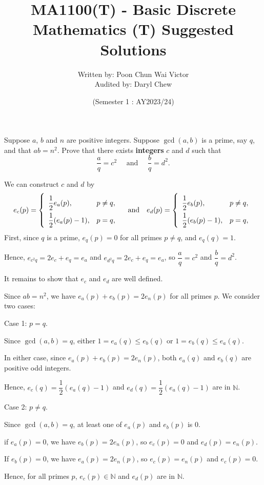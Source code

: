 \documentclass[a4paper, 11pt]{exam}
\title{\vspace{-0.5cm}MA1100(T) - Basic Discrete Mathematics (T) Suggested Solutions}
\author{Written by: Poon Chun Wai Victor\\Audited by: Daryl Chew}
\date{(Semester 1 : AY2023/24)}
\newcommand{\solbox}[1]{\begin{EnvFullwidth}\begin{solution}#1\end{solution}\end{EnvFullwidth}}
\begin{document}
\maketitle
\thispagestyle{headandfoot}
\begin{questions}
\question[4] Suppose \(a\), \(b\) and \(n\) are positive integers. Suppose \(\gcd(a,b)\) is a prime, say \(q\), and that \(ab=n^2\). Prove that there exists \textbf{integers} \(c\) and \(d\) such that
\[\frac{a}{q}=c^2\quad\text{ and }\quad\frac{b}{q}=d^2.\]

\solbox{
We can construct \(c\) and \(d\) by
\[e_c(p)=\left\{\renewcommand{\arraystretch}{2}\begin{array}{ll}
    \dfrac{1}{2}e_a(p),&p\neq q,\\
    \dfrac{1}{2}(e_a(p)-1),&p=q,
\end{array}\right.
\quad\text{and}\quad
e_d(p)=\left\{\renewcommand{\arraystretch}{2}\begin{array}{ll}
    \dfrac{1}{2}e_b(p),&p\neq q,\\
    \dfrac{1}{2}(e_b(p)-1),&p=q,
\end{array}\right.
\]
First, since \(q\) is a prime, \(e_q(p)=0\) for all primes \(p\neq q\), and \(e_q(q)=1\).

Hence, \(e_{c^2q}=2e_c+e_q=e_a\) and \(e_{d^2q}=2e_c+e_q=e_a\), so \(\dfrac{a}{q}=c^2\) and \(\dfrac{b}{q}=d^2\).

It remains to show that \(e_c\) and \(e_d\) are well defined.

Since \(ab=n^2\), we have \(e_a(p)+e_b(p)=2e_n(p)\) for all primes \(p\). We consider two cases:

Case 1: \(p=q\).

Since \(\gcd(a,b)=q\), either \(1=e_a(q)\leq e_b(q)\) or \(1=e_b(q)\leq e_a(q)\).

In either case, since \(e_a(p)+e_b(p)=2e_n(p)\), both \(e_a(q)\) and \(e_b(q)\) are positive odd integers.

Hence, \(e_c(q)=\dfrac{1}{2}(e_a(q)-1)\) and \(e_d(q)=\dfrac{1}{2}(e_a(q)-1)\) are in \(\mathbb{N}\).

Case 2: \(p\neq q\).

Since \(\gcd(a,b)=q\), at least one of \(e_a(p)\) and \(e_b(p)\) is \(0\).

if \(e_a(p)=0\), we have \(e_b(p)=2e_n(p)\), so \(e_c(p)=0\) and \(e_d(p)=e_n(p)\).

If \(e_b(p)=0\), we have \(e_a(p)=2e_n(p)\), so \(e_c(p)=e_n(p)\) and \(e_c(p)=0\).

Hence, for all primes \(p\), \(e_c(p)\in\mathbb{N}\) and \(e_d(p)\) are in \(\mathbb{N}\).

}
\end{questions}
\end{document}
